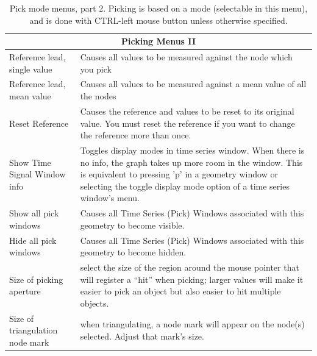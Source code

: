 \begin{table}[ht]
  \caption{\label{table:pickingtwo} Pick mode menus, part 2.  Picking is
    based on a 
    mode (selectable in this menu), and is done with CTRL-left mouse button
    unless otherwise specified.}
  \begin{center}
    \begin{tabular}{|l|p{4 in}|} \hline
      \multicolumn{2}{|c|}{\textbf{Picking Menus II}} \\ \hline
    Reference lead, single value & Causes all values to be measured
    against the node which you pick \\
    Reference lead, mean value & Causes all values to be measured
    against a mean value of all the nodes \\
    Reset Reference & Causes the reference and values to be reset to
    its original value.  You must reset the reference if you want to
    change the reference more than once. \\
    Show Time Signal Window info & Toggles display modes in time series window.
    When there is no info, the graph takes up more room in the window. 
    This is equivalent to pressing 'p' in a geometry window or selecting
    the toggle display mode option of a time series window's menu. \\
    Show all pick windows & Causes all Time Series (Pick) Windows
    associated with this geometry to become visible. \\
    Hide all pick windows & Causes all Time Series (Pick) Windows
    associated with this geometry to become hidden. \\ 
    Size of picking aperture & select the size of the region around the
    mouse 
    pointer that will register a ``hit'' when picking; larger values will
    make it easier to pick an object but also easier to hit multiple
    objects. \\ 
    Size of triangulation node mark & when triangulating, a node
    mark will appear on the node(s) selected.  Adjust that mark's size. 
    \\ \hline
    \end{tabular} 
  \end{center}
\end{table}

